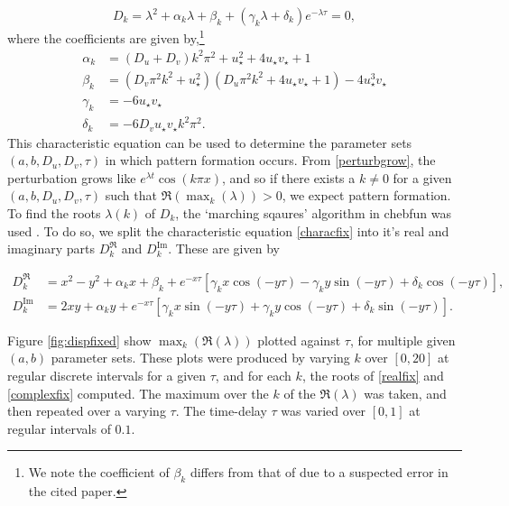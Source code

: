 \documentclass[12pt]{report}
\begin{document}
\begin{equation}\label{characfix}
D_k=\lambda^2+\alpha_k\lambda+\beta_k+(\gamma_k\lambda+\delta_k)e^{-\lambda\tau}=0,
\end{equation}
where the coefficients are given by,\footnote{We note the coefficient of $\beta_k$ differs from that of \cite{yigaffneyli} due to a suspected error in the cited paper.}
\begin{align}
\alpha_k&=(D_u+D_v)k^2\pi^2+u_\star^2+4u_\star v_\star+1\\
\beta_k&=(D_v\pi^2k^2+u_\star^2)(D_u\pi^2k^2+4u_\star v_\star+1)-4u_\star^3v_\star\\
\gamma_k&=-6u_\star v_\star\\
\delta_k&=-6D_vu_\star v_\star k^2\pi^2.
\end{align}
This characteristic equation can be used to determine the parameter sets $(a,b,D_u,D_v,\tau)$ in which pattern formation occurs. From \eqref{perturbgrow}, the perturbation grows like $e^{\lambda t}\cos(k\pi x)$, and so if there exists a $k\neq0$ for a given $(a,b,D_u,D_v,\tau)$ such that $\Re(\max_k(\lambda))>0$, we expect pattern formation. To find the roots $\lambda(k)$ of $D_k$, the `marching sqaures' algorithm \cite{marchingsquares} in chebfun was used \cite{chebfun}. To do so, we split the characteristic equation \eqref{characfix} into it's real and imaginary parts $D_k^{\Re}$ and $D_k^{\text{Im}}$. These are given by

\begin{align}\label{realfix}
D_k^{\Re}&=x^2-y^2+\alpha_kx+\beta_k+e^{-x\tau}[\gamma_kx\cos(-y\tau)-\gamma_ky\sin(-y\tau)+\delta_k\cos(-y\tau)],\\
D_k^{\text{Im}}&=2xy+\alpha_ky+e^{-x\tau}[\gamma_kx\sin(-y\tau)+\gamma_ky\cos(-y\tau)+\delta_k\sin(-y\tau)].\label{complexfix}
\end{align}

Figure \ref{fig:dispfixed}  show $\max_k(\Re(\lambda))$ plotted against $\tau$, for multiple given $(a,b)$ parameter sets. These plots were produced by varying $k$ over $[0,20]$ at regular discrete intervals for a given $\tau$, and for each $k$, the roots of \eqref{realfix} and \eqref{complexfix} computed. The maximum over the $k$ of the $\Re(\lambda)$ was taken, and then repeated over a varying $\tau$. The time-delay $\tau$ was varied over $[0,1]$ at regular intervals of $0.1$.
\end{document}
